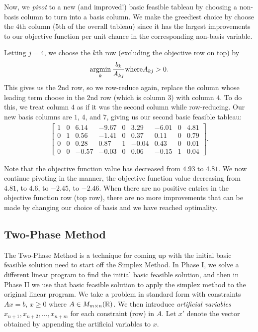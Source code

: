 Now, we \emph{pivot} to a new (and improved!) basic feasible tableau by choosing a non-basis column to turn into a basis column. We make the greediest choice by choose the $4$th column ($5$th of the overall tableau) since it has the largest improvements to our objective function per unit chance in the corresponding non-basis variable.

Letting $j = 4$, we choose the $k$th row (excluding the objective row on top) by \[\operatorname*{argmin}_{k}\frac{b_k}{A_{kj}} \mathrm{ where } A_{kj} > 0.\] This gives us the $2$nd row, so we row-reduce again, replace the column whose leading term choose in the $2$nd row (which is column $3$) with column $4$. To do this, we treat column $4$ as if it was the second column while row-reducing. Our new basis columns are $1$, $4$, and $7$, giving us our second basic feasible tableau:
\begin{align*}
    \left[\begin{array}{c|ccccccc|c}
        1 & 0 & 6.14  & -9.67 & 0 & 3.29  & -6.01 & 0 & 4.81 \\
        \hline
        0 & 1 & 0.56  & -1.41 & 0 & 0.37  & 0.11  & 0 & 0.79 \\
        0 & 0 & 0.28  & 0.87  & 1 & -0.04 & 0.43  & 0 & 0.01 \\
        0 & 0 & -0.57 & -0.03 & 0 & 0.06  & -0.15 & 1 & 0.04
    \end{array}\right].
\end{align*}

Note that the objective function value has decreased from $4.93$ to $4.81$. We now continue pivoting in the manner, the objective function value decreasing from $4.81$, to $4.6$, to $-2.45$, to $-2.46$. When there are no positive entries in the objective function row (top row), there are no more improvements that can be made by changing our choice of basis and we have reached optimality.

\subsection{Two-Phase Method}

The Two-Phase Method is a technique for coming up with the initial basic feasible solution need to start off the Simplex Method. In Phase I, we solve a different linear program to find the initial basic feasible solution, and then in Phase II we use that basic feasible solution to apply the simplex method to the original linear program. We take a problem in standard form with constraints $Ax = b$, $x \geq 0$ where $A \in M_{m \times n}(\mathbb{R})$. We then introduce \emph{artificial variables} $x_{n+1}, x_{n+2}, \ldots, x_{n+m}$ for each constraint (row) in $A$. Let $x'$ denote the vector obtained by appending the artificial variables to $x$.

